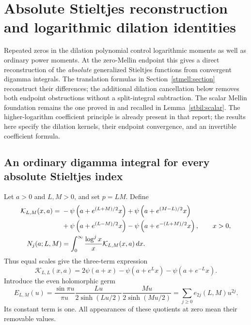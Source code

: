 \section{Absolute Stieltjes reconstruction and logarithmic dilation identities}
\label{stconf:section}

Repeated zeros in the dilation polynomial control logarithmic moments
as well as ordinary power moments. At the zero-Mellin endpoint this
gives a direct reconstruction of the \emph{absolute} generalized
Stieltjes functions from convergent digamma integrals. The translation
formulas in Section~\ref{stmell:section} reconstruct their differences;
the additional dilation cancellation below removes both endpoint
obstructions without a split-integral subtraction. The scalar Mellin
foundation remains the one proved in \cite{stmell:balanced} and
recalled in Lemma~\ref{stbil:scalar}. The higher-logarithm coefficient
principle is already present in that report; the results here specify
the dilation kernels, their endpoint convergence, and an invertible
coefficient formula.

\subsection{An ordinary digamma integral for every absolute Stieltjes index}

Let $a>0$ and $L,M>0$, and set $p=LM$. Define
\begin{align}
 \mathcal K_{L,M}(x,a)
   ={}&-\psi\left(a+e^{(L+M)/2}x\right)
       +\psi\left(a+e^{(M-L)/2}x\right)\notag\\
     &+\psi\left(a+e^{(L-M)/2}x\right)
       -\psi\left(a+e^{-(L+M)/2}x\right),\qquad x>0,
       \label{stconf:digamma-kernel}\\
 N_j(a;L,M)&=\int_0^\infty
           \frac{\log^j x}{x}\mathcal K_{L,M}(x,a)\,dx.
       \label{stconf:N}
\end{align}
Thus equal scales give the three-term expression
\[
 \mathcal K_{L,L}(x,a)
      =2\psi(a+x)-\psi(a+e^Lx)-\psi(a+e^{-L}x).
\]
Introduce the even holomorphic germ
\begin{equation}\label{stconf:even-germ}
 E_{L,M}(u)=\frac{\sin\pi u}{\pi u}
       \frac{Lu}{2\sinh(Lu/2)}\frac{Mu}{2\sinh(Mu/2)}
       =\sum_{j\ge0}e_{2j}(L,M)u^{2j}.
\end{equation}
Its constant term is one. All appearances of these quotients at zero
mean their removable values.

